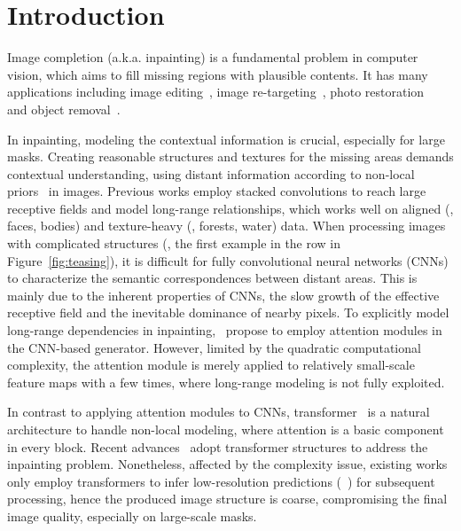 \documentclass[10pt,twocolumn,letterpaper]{article}
\begin{document}
\vspace{-0.1in}
	\section{Introduction}
	\label{sec:intro}
	
	Image completion (a.k.a. inpainting) is a fundamental problem in computer vision, which aims to fill missing regions with plausible contents. It has many applications including image editing~\cite{jo2019sc}, image re-targeting~\cite{cho2017weakly}, photo restoration~\cite{wan2020bringing,wan2020old} and object removal~\cite{barnes2009patchmatch}.
	
	In inpainting, modeling the contextual information is crucial, especially for large masks. Creating reasonable structures and textures for the missing areas demands contextual understanding, using distant information according to non-local priors~\cite{buades2005non,mairal2009non,berman2016non,wang2018non} in images. Previous works employ stacked convolutions to reach large receptive fields and model long-range relationships, which works well on aligned (\eg, faces, bodies) and texture-heavy (\eg, forests, water) data. When processing images with complicated structures (\ie, the first example in the  row in Figure~\ref{fig:teasing}), it is difficult for fully convolutional neural networks (CNNs) to characterize the semantic correspondences between distant areas. This is mainly due to the inherent properties of CNNs, the slow growth of the effective receptive field and the inevitable dominance of nearby pixels. To explicitly model long-range dependencies in inpainting,~\cite{yu2018generative,xie2019image,yi2020contextual} propose to employ attention modules in the CNN-based generator. However, limited by the quadratic computational complexity, the attention module is merely applied to relatively small-scale feature maps with a few times, where long-range modeling is not fully exploited.
	
	In contrast to applying attention modules to CNNs, transformer~\cite{vaswani2017attention} is a natural architecture to handle non-local modeling, where attention is a basic component in every block. Recent advances~\cite{wan2021high,zheng2021tfill,yu2021diverse} adopt transformer structures to address the inpainting problem. Nonetheless, affected by the complexity issue, existing works only employ transformers to infer low-resolution predictions (\eg\ ) for subsequent processing, hence the produced image structure is coarse, compromising the final image quality, especially on large-scale masks.
	
\end{document}
